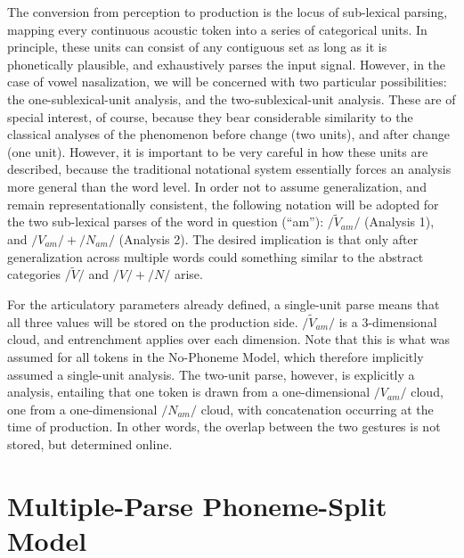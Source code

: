 The conversion from perception to production is the locus of sub-lexical
parsing, mapping every continuous acoustic token into a series of
categorical units. In principle, these units can consist of any contiguous
set as long as it is phonetically plausible, and exhaustively parses
the input signal. However, in the case of vowel nasalization, we will
be concerned with two particular possibilities: the one-sublexical-unit
analysis, and the two-sublexical-unit analysis. These are of special
interest, of course, because they bear considerable similarity to
the classical analyses of the phenomenon before change (two units),
and after change (one unit). However, it is important to be very careful
in how these units are described, because the traditional notational
system essentially forces an analysis more general than the
word level. In order not to assume generalization, and remain representationally
consistent, the following notation will be adopted for the two sub-lexical
parses of the word in question (“am”): $/\tilde{V}_{am}/$ (Analysis
1), and $/V_{am}/+/N_{am}/$ (Analysis 2). The desired implication
is that only after generalization across multiple words could something
similar to the abstract categories $/\widetilde{V}/$ and $/V/+/N/$
arise.

For the articulatory parameters already defined, a single-unit parse
means that all three values will be stored on the production side.
$/\tilde{V}_{am}/$ is a 3-dimensional cloud, and entrenchment applies
over each dimension. Note that this is what was assumed for all tokens
in the No-Phoneme Model, which therefore implicitly assumed a single-unit
analysis. The two-unit parse, however, is explicitly a 
analysis, entailing that one token is drawn from a one-dimensional
\emph{$/V_{am}/$} cloud, one from a one-dimensional \emph{$/N_{am}/$}
cloud, with concatenation occurring at the time of production. In
other words, the overlap between the two gestures is not stored, but
determined online. 

\section{Multiple-Parse Phoneme-Split Model}

